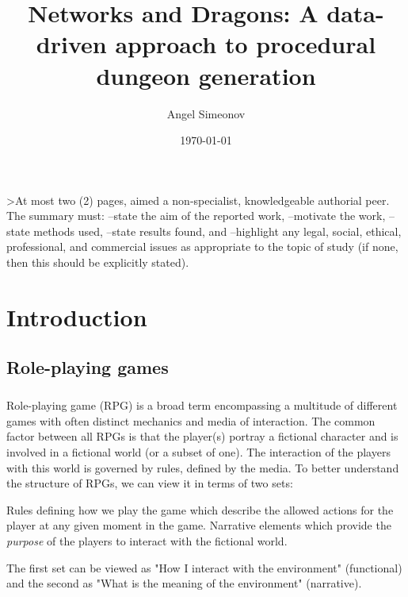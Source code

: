 \documentclass{UoYCSproject}
\author{Angel Simeonov}
\title{Networks and Dragons: A data-driven approach to procedural dungeon generation}
\date{\today}
\begin{document}
\maketitle
\listoffigures
\listoftables

\begin{summary}
>At most two (2) pages, aimed a non-specialist, knowledgeable authorial peer.
The summary must:
--state the aim of the reported work,
--motivate the work,
--state methods used,
--state results found, and
--highlight any legal, social, ethical, professional, and commercial issues as appropriate to the topic of study (if none, then this should be explicitly stated).
\end{summary}

\chapter{Introduction}
\label{cha:Introduction}

\section{Role-playing games}

\paragraph{}
Role-playing game (RPG) is a broad term encompassing a multitude of different games with often distinct mechanics and media of interaction. The common factor between all RPGs is that the player(s) portray a fictional character and is involved in a fictional world (or a subset of one). The interaction of the players with this world is governed by rules, defined by the media. To better understand the structure of RPGs, we can view it in terms of two sets: 
\begin{outline}[enumerate]
  \1 Rules defining how we play the game which describe the allowed actions for the player at any given moment in the game.
  \1 Narrative elements which provide the \textit{purpose} of the players to interact with the fictional world. 
\end{outline}
The first set can be viewed as "How I interact with the environment" (functional) and the second as "What is the meaning of the environment" (narrative).
\end{document}
